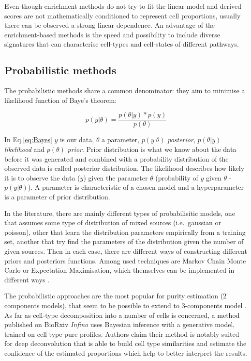 \documentclass[12pt,]{book}
\theoremstyle{definition}
\theoremstyle{definition}
\theoremstyle{definition}
\theoremstyle{remark}
\begin{document}
Even though enrichment methods do not try to fit the linear model and
derived scores are not mathematically conditioned to represent cell
proportions, usually there can be observed a strong linear dependence.
An advantage of the enrichment-based methods is the speed and
possibility to include diverse signatures that can characterise
cell-types and cell-states of different pathways.

\hypertarget{probabilistic-methods}{%
\subsection{Probabilistic methods}\label{probabilistic-methods}}

The probabilistic methods share a common denominator: they aim to
minimise a likelihood function of Baye's theorem:

\begin{equation}
p(y|\theta) = \frac{p(\theta|y )* p(y)}{p(\theta)} \label{eq:Bayes}
\end{equation}

In Eq.\eqref{eq:Bayes} \(y\) is our data, \(\theta\) a parameter,
\(p(y|\theta)\) \emph{posterior}, \(p(\theta|y )\) \emph{likelihood} and
\(p(\theta)\) \emph{prior}. Prior distribution is what we know about the
data before it was generated and combined with a probability
distribution of the observed data is called posterior distribution. The
likelihood describes how likely it is to observe the data (\(y\)) given
the parameter \(\theta\) (probability of \(y\) given \(\theta\) -
\(p(y|\theta)\)). A parameter is characteristic of a chosen model and a
hyperparameter is a parameter of prior distribution.

In the literature, there are mainly different types of probabilisitic
models, one that assumes some type of distribution of mixed sources
(i.e.~gaussian or poisson), other that learn the distribution parameters
empirically from a training set, another that try find the parameters of
the distribution given the number of given sources. Then in each case,
there are different ways of constructing different priors and posteriors
functions. Among used techniques are Markov Chain Monte Carlo or
Expectation-Maximisation, which themselves can be implemented in
different ways
\citep[\citet{Zaslavsky2017}]{Erkkila2010, Ghosh2004, Lahdesmaki2005, Li2013, Roy2006}.

The probabilistic approaches are the most popular for purity estimation
(2 components models), that seem to be possible to extend to
3-components model \citep{Wang2017}. As far as cell-type decomposition
into a number of cells is concerned, a method published on BioRxiv
\emph{Infino} uses Bayesian inference with a generative model, trained
on cell type pure profiles. Authors claim their method is notably suited
for deep deconvolution that is able to build cell type similarities and
estimate the confidence of the estimated proportions which help to
better interpret the results.
\end{document}
